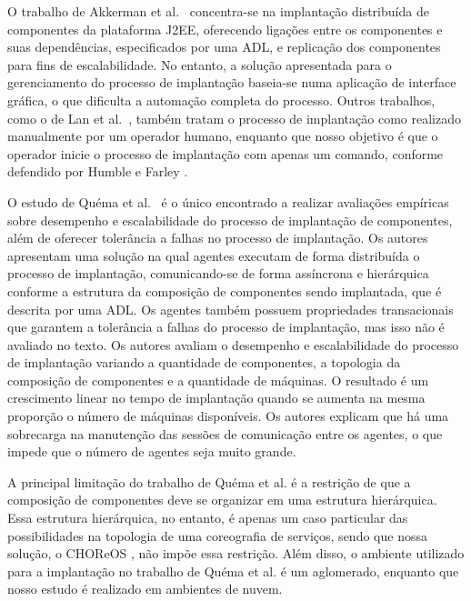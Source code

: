 O trabalho de Akkerman et al.~\cite{Akkerman2005J2EE} concentra-se na implantação distribuída de componentes da plataforma J2EE, oferecendo ligações entre os componentes e suas dependências, especificados por uma ADL, e replicação dos componentes para fins de escalabilidade. No entanto, a solução apresentada para o gerenciamento do processo de implantação baseia-se numa aplicação de interface gráfica, o que dificulta a automação completa do processo. Outros trabalhos, como o de Lan et al.~\cite{Lan2005Architecture}, também tratam o processo de implantação como realizado manualmente por um operador humano, enquanto que nosso objetivo é que o operador inicie o processo de implantação com apenas um comando, conforme defendido por Humble e Farley \cite{Humble2011Continuous}.

O estudo de Quéma et al.~\cite{quema2004hierarchical} é o único encontrado a realizar avaliações empíricas sobre desempenho e escalabilidade do processo de implantação de componentes, além de oferecer tolerância a falhas no processo de implantação. Os autores apresentam uma solução na qual agentes executam de forma distribuída o processo de implantação, comunicando-se de forma assíncrona e hierárquica conforme a estrutura da composição de componentes sendo implantada, que é descrita por uma ADL. Os agentes também possuem propriedades transacionais que garantem a tolerância a falhas do processo de implantação, mas isso não é avaliado no texto. 
Os autores avaliam o desempenho e escalabilidade do processo de implantação variando a quantidade de componentes, a topologia da composição de componentes e a quantidade de máquinas. O resultado é um crescimento linear no tempo de implantação quando se aumenta na mesma proporção o número de máquinas disponíveis. Os autores explicam que há uma sobrecarga na manutenção das sessões de comunicação entre os agentes, o que impede que o número de agentes seja muito grande. 

A principal limitação do trabalho de Quéma et al. é a restrição de que a composição de componentes deve se organizar em uma estrutura hierárquica. Essa estrutura hierárquica, no entanto, é apenas um caso particular das possibilidades na topologia de uma coreografia de serviços, sendo que nossa solução, o CHOReOS \ee, não impõe essa restrição. Além disso, o ambiente utilizado para a implantação no trabalho de Quéma et al. é um aglomerado, enquanto que nosso estudo é realizado em ambientes de nuvem.

